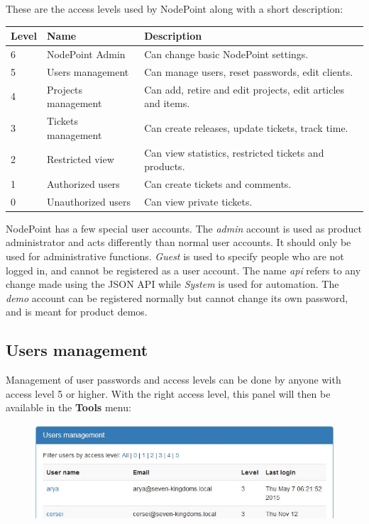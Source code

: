 \documentclass[11pt]{article}
\begin{document}
These are the access levels used by NodePoint along with a short description:

\def\arraystretch{1.3} 
\begin{tabular}{ |p{15mm}|p{50mm}|p{100mm}| } 
\hline
\textbf{Level} & \textbf{Name} & \textbf{Description}\\
\hline
6 & NodePoint Admin & Can change basic NodePoint settings.\\
5 & Users management & Can manage users, reset passwords, edit clients.\\
4 & Projects management & Can add, retire and edit projects, edit articles and items.\\
3 & Tickets management & Can create releases, update tickets, track time.\\
2 & Restricted view & Can view statistics, restricted tickets and products.\\
1 & Authorized users & Can create tickets and comments.\\
0 & Unauthorized users & Can view private tickets.\\
\hline
\end{tabular}

NodePoint has a few special user accounts. The \textit{admin} account is used as product administrator and acts differently than normal user accounts. It should only be used for administrative functions. \textit{Guest} is used to specify people who are not logged in, and cannot be registered as a user account. The name \textit{api} refers to any change made using the JSON API while \textit{System} is used for automation. The \textit{demo} account can be registered normally but cannot change its own password, and is meant for product demos.

\subsection{Users management}
Management of user passwords and access levels can be done by anyone with access level 5 or higher. With the right access level, this panel will then be available in the \textbf{Tools} menu:

\begin{figure}[h]
\includegraphics{userman.jpg}
\end{figure}
\end{document}
